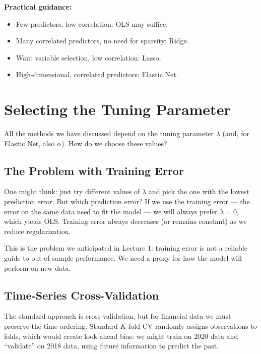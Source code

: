 \documentclass[11pt,a4paper]{article}
\begin{document}
\textbf{Practical guidance:}
\begin{itemize}
    \item Few predictors, low correlation: OLS may suffice.
    \item Many correlated predictors, no need for sparsity: Ridge.
    \item Want variable selection, low correlation: Lasso.
    \item High-dimensional, correlated predictors: Elastic Net.
\end{itemize}

\section{Selecting the Tuning Parameter}

All the methods we have discussed depend on the tuning parameter $\lambda$ (and, for Elastic Net, also $\alpha$). How do we choose these values?

\subsection{The Problem with Training Error}

One might think: just try different values of $\lambda$ and pick the one with the lowest prediction error. But which prediction error? If we use the training error — the error on the same data used to fit the model — we will always prefer $\lambda = 0$, which yields OLS. Training error always decreases (or remains constant) as we reduce regularization.

This is the problem we anticipated in Lecture 1: training error is not a reliable guide to out-of-sample performance. We need a proxy for how the model will perform on new data.

\subsection{Time-Series Cross-Validation}

The standard approach is cross-validation, but for financial data we must preserve the time ordering. Standard $K$-fold CV randomly assigns observations to folds, which would create look-ahead bias: we might train on 2020 data and ``validate'' on 2018 data, using future information to predict the past.
\end{document}
